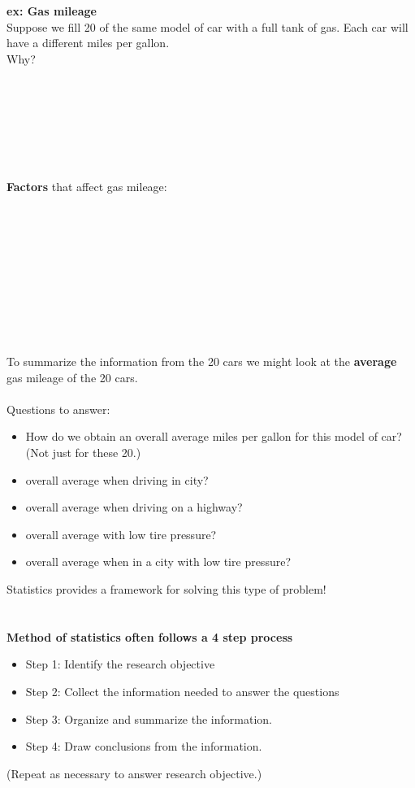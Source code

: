 \textbf{ex: Gas mileage}\\
Suppose we fill 20 of the same model of car with a full tank of gas.  Each car will have a different miles per gallon.\\
Why?  \\~\\~\\~\\~\\~\\~\\~\\
\textbf{Factors} that affect gas mileage:\\~\\~\\~\\~\\~\\~\\~\\~\\~\\~\\
To summarize the information from the 20 cars we might look at the \textbf{average} gas mileage of the 20 cars.\\~\\
Questions to answer:
\begin{itemize}
\item How do we obtain an overall average miles per gallon for this model of car?  (Not just for these 20.)
\item	overall average when driving in city?
\item overall average when driving on a highway?
\item overall average with low tire pressure?
\item overall average when in a city with low tire pressure?
\end{itemize}
Statistics provides a framework for solving this type of problem!\\~\\~\\


\textbf{Method of statistics often follows a 4 step process}
\begin{itemize}
\item	Step 1: Identify the research objective
\item	Step 2: Collect the information needed to answer the questions
\item Step 3: Organize and summarize the information.
\item Step 4: Draw conclusions from the information.
\end{itemize}
(Repeat as necessary to answer research objective.)

